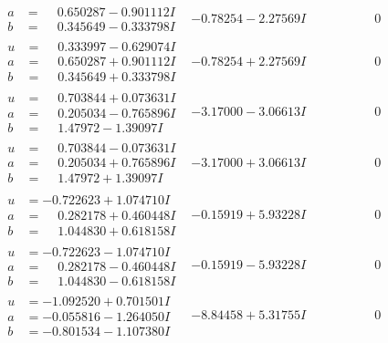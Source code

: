 \documentclass[1p]{elsarticle_modified}
\theoremstyle{definition}
\begin{document}
$$\begin{array}{c|c|c}
\begin{aligned}
a &= \phantom{-}0.650287 - 0.901112 I \\
b &= \phantom{-}0.345649 - 0.333798 I\end{aligned}
 & -0.78254 - 2.27569 I & \phantom{-0.000000 } 0 \\ \hline\begin{aligned}
u &= \phantom{-}0.333997 - 0.629074 I \\
a &= \phantom{-}0.650287 + 0.901112 I \\
b &= \phantom{-}0.345649 + 0.333798 I\end{aligned}
 & -0.78254 + 2.27569 I & \phantom{-0.000000 } 0 \\ \hline\begin{aligned}
u &= \phantom{-}0.703844 + 0.073631 I \\
a &= \phantom{-}0.205034 - 0.765896 I \\
b &= \phantom{-}1.47972 - 1.39097 I\end{aligned}
 & -3.17000 - 3.06613 I & \phantom{-0.000000 } 0 \\ \hline\begin{aligned}
u &= \phantom{-}0.703844 - 0.073631 I \\
a &= \phantom{-}0.205034 + 0.765896 I \\
b &= \phantom{-}1.47972 + 1.39097 I\end{aligned}
 & -3.17000 + 3.06613 I & \phantom{-0.000000 } 0 \\ \hline\begin{aligned}
u &= -0.722623 + 1.074710 I \\
a &= \phantom{-}0.282178 + 0.460448 I \\
b &= \phantom{-}1.044830 + 0.618158 I\end{aligned}
 & -0.15919 + 5.93228 I & \phantom{-0.000000 } 0 \\ \hline\begin{aligned}
u &= -0.722623 - 1.074710 I \\
a &= \phantom{-}0.282178 - 0.460448 I \\
b &= \phantom{-}1.044830 - 0.618158 I\end{aligned}
 & -0.15919 - 5.93228 I & \phantom{-0.000000 } 0 \\ \hline\begin{aligned}
u &= -1.092520 + 0.701501 I \\
a &= -0.055816 - 1.264050 I \\
b &= -0.801534 - 1.107380 I\end{aligned}
 & -8.84458 + 5.31755 I & \phantom{-0.000000 } 0 \\ \hline\begin{aligned}

\end{aligned}
\end{array}$$
\end{document}
